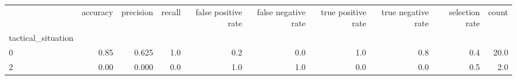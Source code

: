 \begin{tabular}{lrrrrrrrrr}
\toprule
{} &  accuracy &  precision &  recall &  false positive rate &  false negative rate &  true positive rate &  true negative rate &  selection rate &  count \\
tactical\_situation &           &            &         &                      &                      &                     &                     &                 &        \\
\midrule
0                  &      0.85 &      0.625 &     1.0 &                  0.2 &                  0.0 &                 1.0 &                 0.8 &             0.4 &   20.0 \\
2                  &      0.00 &      0.000 &     0.0 &                  1.0 &                  1.0 &                 0.0 &                 0.0 &             0.5 &    2.0 \\
\bottomrule
\end{tabular}
